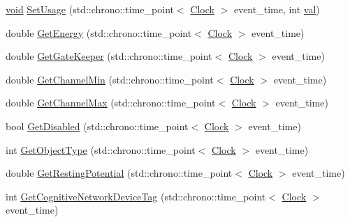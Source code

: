 \begin{DoxyCompactItemize}
\item 
\mbox{\hyperlink{glad_8h_a950fc91edb4504f62f1c577bf4727c29}{void}} \mbox{\hyperlink{class_cognitive_network_a8b6b4afc47df279604be13bce77f5b0a}{Set\+Usage}} (std\+::chrono\+::time\+\_\+point$<$ \mbox{\hyperlink{universe_8h_a0ef8d951d1ca5ab3cfaf7ab4c7a6fd80}{Clock}} $>$ event\+\_\+time, int \mbox{\hyperlink{glad_8h_a26942fd2ed566ef553eae82d2c109c8f}{val}})
\item 
double \mbox{\hyperlink{class_cognitive_network_af23b9bce2587ccf3c8204be33fc76c61}{Get\+Energy}} (std\+::chrono\+::time\+\_\+point$<$ \mbox{\hyperlink{universe_8h_a0ef8d951d1ca5ab3cfaf7ab4c7a6fd80}{Clock}} $>$ event\+\_\+time)
\item 
double \mbox{\hyperlink{class_cognitive_network_a3a9be1c6697d063b0836cdcdc7a2600c}{Get\+Gate\+Keeper}} (std\+::chrono\+::time\+\_\+point$<$ \mbox{\hyperlink{universe_8h_a0ef8d951d1ca5ab3cfaf7ab4c7a6fd80}{Clock}} $>$ event\+\_\+time)
\item 
double \mbox{\hyperlink{class_cognitive_network_ad7f5cc836340017d38c22b57e177fc91}{Get\+Channel\+Min}} (std\+::chrono\+::time\+\_\+point$<$ \mbox{\hyperlink{universe_8h_a0ef8d951d1ca5ab3cfaf7ab4c7a6fd80}{Clock}} $>$ event\+\_\+time)
\item 
double \mbox{\hyperlink{class_cognitive_network_ab67da8690b83618d88f88411121d7071}{Get\+Channel\+Max}} (std\+::chrono\+::time\+\_\+point$<$ \mbox{\hyperlink{universe_8h_a0ef8d951d1ca5ab3cfaf7ab4c7a6fd80}{Clock}} $>$ event\+\_\+time)
\item 
bool \mbox{\hyperlink{class_cognitive_network_aa64c93ecec84b57b25e1fdb173795f9b}{Get\+Disabled}} (std\+::chrono\+::time\+\_\+point$<$ \mbox{\hyperlink{universe_8h_a0ef8d951d1ca5ab3cfaf7ab4c7a6fd80}{Clock}} $>$ event\+\_\+time)
\item 
int \mbox{\hyperlink{class_cognitive_network_a1c92a8f6c42788cf8ca890f062f853a3}{Get\+Object\+Type}} (std\+::chrono\+::time\+\_\+point$<$ \mbox{\hyperlink{universe_8h_a0ef8d951d1ca5ab3cfaf7ab4c7a6fd80}{Clock}} $>$ event\+\_\+time)
\item 
double \mbox{\hyperlink{class_cognitive_network_a03d744f9d0d420c1e044646bc6bd2552}{Get\+Resting\+Potential}} (std\+::chrono\+::time\+\_\+point$<$ \mbox{\hyperlink{universe_8h_a0ef8d951d1ca5ab3cfaf7ab4c7a6fd80}{Clock}} $>$ event\+\_\+time)
\item 
int \mbox{\hyperlink{class_cognitive_network_af33f3ff9dd829da73d183d2624f24964}{Get\+Cognitive\+Network\+Device\+Tag}} (std\+::chrono\+::time\+\_\+point$<$ \mbox{\hyperlink{universe_8h_a0ef8d951d1ca5ab3cfaf7ab4c7a6fd80}{Clock}} $>$ event\+\_\+time)

\end{DoxyCompactItemize}

